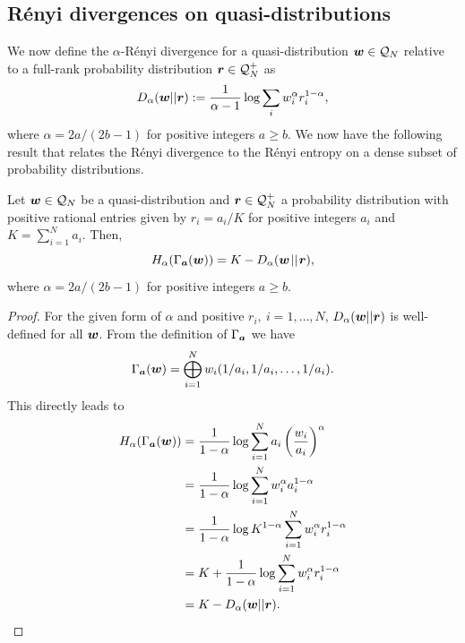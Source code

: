 \documentclass[pra,
aps,
twocolumn,
superscriptaddress,
groupedaddress,
nofootinbib,
reprint
]{revtex4-1}
\begin{document}
\subsection{R\'{e}nyi divergences on quasi-distributions}
We now define the $\alpha$-R\'{e}nyi divergence for a quasi-distribution $\boldsymbol{w} \in \mathcal{Q}_N$ relative to a full-rank probability distribution $\boldsymbol{r}\in \mathcal{Q}_N^+$ as
\begin{equation}
	D_\alpha(\boldsymbol{w}||\boldsymbol{r}) := \frac{1}{\alpha - 1} \log \sum_{i} w_i^\alpha r_i^{1-\alpha},
\end{equation}
where $\alpha=2a/(2b-1)$ for positive integers $a \ge b$. We now have the following result that relates the R\'{e}nyi divergence to the R\'{e}nyi entropy on a dense subset of probability distributions.
\begin{theorem}\label{thm:H2D}
	Let $\boldsymbol{w}\in \mathcal{Q}_N$ be a quasi-distribution and $\boldsymbol{r} \in \mathcal{Q}_N^+$ a probability distribution with positive rational entries given by $r_i = a_i/K$ for positive integers $a_i$ and $K = \sum_{i=1}^N a_i$.
	Then,
	\begin{equation}
		H_\alpha(\Gamma_{\bm{a}}(\boldsymbol{w})) = K - D_\alpha(\boldsymbol{w} \hspace{1pt}||\hspace{1pt} \boldsymbol{r}),
	\end{equation}
	where $\alpha = 2a / (2b-1)$ for positive integers $a \ge b$.
\end{theorem}
\begin{proof}
	For the given form of $\alpha$ and positive $r_i,\ i=1,\dots,N$, $D_\alpha(\boldsymbol{w} || \boldsymbol{r})$ is well-defined for all $\boldsymbol{w}$. From the definition of $\Gamma_{\bm{a}}$ we have
	\begin{equation}
		\Gamma_{\bm{a}}(\boldsymbol{w}) = \bigoplus_{i=1}^N w_i (1/a_i, 1/a_i, \dots, 1/a_i).
	\end{equation}
	This directly leads to
	\begin{align}
		H_\alpha(\Gamma_{\bm{a}}(\boldsymbol{w})) &= \frac{1}{1-\alpha} \log \sum_{i=1}^N a_i \left( \frac{w_i}{a_i} \right)^\alpha \nonumber\\
		&= \frac{1}{1-\alpha} \log \sum_{i=1}^N w_i^{\alpha} a_i^{1-\alpha} \nonumber\\
		&= \frac{1}{1-\alpha} \log K^{1-\alpha} \sum_{i=1}^N w_i^{\alpha} r_i^{1-\alpha} \nonumber\\
		&= K + \frac{1}{1-\alpha} \log \sum_{i=1}^N w_i^{\alpha} r_i^{1-\alpha} \nonumber\\
		&= K - D_\alpha(\boldsymbol{w} ||\boldsymbol{r}).
	\end{align}
\end{proof}
\end{document}
